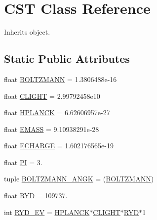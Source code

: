 \hypertarget{classpyneb_1_1utils_1_1physics_1_1_c_s_t}{}\section{C\+S\+T Class Reference}
\label{classpyneb_1_1utils_1_1physics_1_1_c_s_t}


Inherits object.

\subsection*{Static Public Attributes}
\begin{DoxyCompactItemize}
\item 
float \hyperlink{classpyneb_1_1utils_1_1physics_1_1_c_s_t_a10bc94b084629bc227f8317335dff431}{B\+O\+L\+T\+Z\+M\+A\+N\+N} = 1.\+3806488e-\/16
\item 
float \hyperlink{classpyneb_1_1utils_1_1physics_1_1_c_s_t_a07b7f370730de2710e80bf55753bc64c}{C\+L\+I\+G\+H\+T} = 2.\+99792458e10
\item 
float \hyperlink{classpyneb_1_1utils_1_1physics_1_1_c_s_t_ac6b3322e77438ceaca8776f2700d4b75}{H\+P\+L\+A\+N\+C\+K} = 6.\+62606957e-\/27
\item 
float \hyperlink{classpyneb_1_1utils_1_1physics_1_1_c_s_t_a5387ad536e3559f1910a5b9d8e99ba71}{E\+M\+A\+S\+S} = 9.\+10938291e-\/28
\item 
float \hyperlink{classpyneb_1_1utils_1_1physics_1_1_c_s_t_a63b5893974bf6c0149f3616672070966}{E\+C\+H\+A\+R\+G\+E} = 1.\+602176565e-\/19
\item 
float \hyperlink{classpyneb_1_1utils_1_1physics_1_1_c_s_t_a4c43e2b8db2027e48251350d972a39c2}{P\+I} = 3.
\item 
tuple \hyperlink{classpyneb_1_1utils_1_1physics_1_1_c_s_t_a875172553ae6c267f2a125be4c8ea1e4}{B\+O\+L\+T\+Z\+M\+A\+N\+N\+\_\+\+A\+N\+G\+K} = (\hyperlink{classpyneb_1_1utils_1_1physics_1_1_c_s_t_a10bc94b084629bc227f8317335dff431}{B\+O\+L\+T\+Z\+M\+A\+N\+N})
\item 
float \hyperlink{classpyneb_1_1utils_1_1physics_1_1_c_s_t_a9486e888feff666351927a0cb76651a2}{R\+Y\+D} = 109737.
\item 
int \hyperlink{classpyneb_1_1utils_1_1physics_1_1_c_s_t_a3a526fd5290b7527a59057993afdd7b4}{R\+Y\+D\+\_\+\+E\+V} = \hyperlink{classpyneb_1_1utils_1_1physics_1_1_c_s_t_ac6b3322e77438ceaca8776f2700d4b75}{H\+P\+L\+A\+N\+C\+K}$\ast$\hyperlink{classpyneb_1_1utils_1_1physics_1_1_c_s_t_a07b7f370730de2710e80bf55753bc64c}{C\+L\+I\+G\+H\+T}$\ast$\hyperlink{classpyneb_1_1utils_1_1physics_1_1_c_s_t_a9486e888feff666351927a0cb76651a2}{R\+Y\+D}$\ast$1

\end{DoxyCompactItemize}

